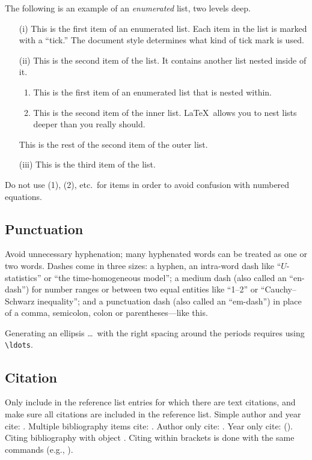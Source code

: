 \documentclass[te,nameyear,final,supplement]{econsocart}
\theoremstyle{plain}
\theoremstyle{definition}
\begin{document}
The following is an example of an \emph{enumerated} list, two levels deep.
\begin{enumerate}[(ii)]
\item[(i)]
This is the first item of an enumerated list.  Each item
in the list is marked with a ``tick.''  The document
style determines what kind of tick mark is used.
\item[(ii)]
This is the second item of the list.  It contains another
list nested inside of it.
\begin{enumerate}
\item
This is the first item of an enumerated list that
is nested within.
\item
This is the second item of the inner list.  \LaTeX\
allows you to nest lists deeper than you really should.
\end{enumerate}
This is the rest of the second item of the outer list.
\item [(iii)]
This is the third item of the list.
\end{enumerate}

Do not use (1), (2), etc.\ for items in order to avoid confusion with numbered equations.

\subsection{Punctuation}
Avoid unnecessary hyphenation; many hyphenated words can be treated as one or two words.
Dashes come in three sizes: a hyphen, an intra-word dash like ``$U$-statistics'' or ``the time-homogeneous model'';
a medium dash (also called an ``en-dash'') for number ranges or between two equal entities like ``1--2'' or ``Cauchy--Schwarz inequality'';
and a punctuation dash (also called an ``em-dash'') in place of a comma, semicolon,
colon or parentheses---like this.

Generating an ellipsis \ldots\ with the right spacing
around the periods requires using \verb|\ldots|.

\subsection{Citation}
Only include in the reference list entries for which there are text citations,
and make sure all citations are included in the reference list.
Simple author and year cite: \citet{b1}. 
Multiple bibliography items cite: \citet{b2,b3,b4,b5}.
Author only cite: \citeauthor{b4}.
Year only cite: (\citeyear{b4}). Citing bibliography with object \citet[Theorem 1]{b1}. Citing within brackets is done with the same commands (e.g., \citet{b2,b3,b4}).
\end{document}
